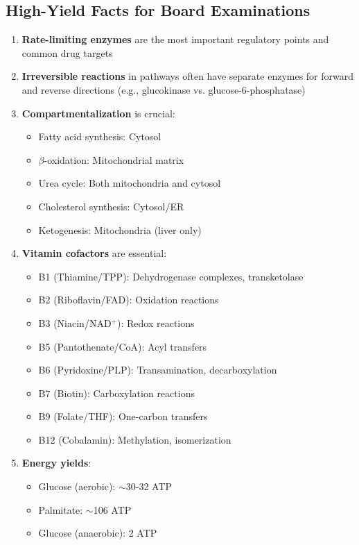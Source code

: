\subsection{High-Yield Facts for Board Examinations}

\begin{enumerate}
    \item \textbf{Rate-limiting enzymes} are the most important regulatory points and common drug targets
    
    \item \textbf{Irreversible reactions} in pathways often have separate enzymes for forward and reverse directions (e.g., glucokinase vs. glucose-6-phosphatase)
    
    \item \textbf{Compartmentalization} is crucial:
    \begin{itemize}
        \item Fatty acid synthesis: Cytosol
        \item $\beta$-oxidation: Mitochondrial matrix
        \item Urea cycle: Both mitochondria and cytosol
        \item Cholesterol synthesis: Cytosol/ER
        \item Ketogenesis: Mitochondria (liver only)
    \end{itemize}
    
    \item \textbf{Vitamin cofactors} are essential:
    \begin{itemize}
        \item B1 (Thiamine/TPP): Dehydrogenase complexes, transketolase
        \item B2 (Riboflavin/FAD): Oxidation reactions
        \item B3 (Niacin/NAD$^+$): Redox reactions
        \item B5 (Pantothenate/CoA): Acyl transfers
        \item B6 (Pyridoxine/PLP): Transamination, decarboxylation
        \item B7 (Biotin): Carboxylation reactions
        \item B9 (Folate/THF): One-carbon transfers
        \item B12 (Cobalamin): Methylation, isomerization
    \end{itemize}
    
    \item \textbf{Energy yields}:
    \begin{itemize}
        \item Glucose (aerobic): $\sim$30-32 ATP
        \item Palmitate: $\sim$106 ATP
        \item Glucose (anaerobic): 2 ATP
    \end{itemize}
\end{enumerate}

